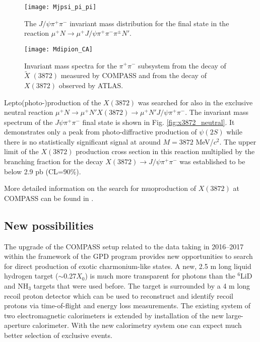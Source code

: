 \documentclass[a4paper]{jpconf}
\begin{document}
 \begin{figure}
 \begin{minipage}{18pc}
   \texttt{[image: Mjpsi\_pi\_pi]}  
     \caption{\label{fig:x3872}
 The $J/\psi\pi^+\pi^-$ invariant mass distribution for the final state in the reaction $\mu^+ N \to \mu^+ J/\psi\pi^+\pi^-\pi^{\pm} N'$.}
\end{minipage}\hspace{2pc}%
\begin{minipage}{18pc}
   \texttt{[image: Mdipion\_CA]}  
     \caption{\label{fig:pipi} Invariant mass spectra for the $\pi^+\pi^-$ subsystem from the decay of $\widetilde{X}􏰐(3872)$ measured by COMPASS  and from the decay of $X(3872)$ observed by ATLAS.}
\end{minipage}
 \end{figure}
 
 Lepto(photo-)production of the $X(3872)$ was searched for also in the exclusive neutral reaction $\mu^+ N \rightarrow \mu^+ N' X(3872) \rightarrow \mu^+ N' J/\psi \pi^+\pi^-$. The invariant mass spectrum of the $J\psi\pi^+\pi^-$ final state is shown in Fig. \ref{fig:x3872_neutral}. It demonstrates only a peak from photo-diffractive production of $\psi(2S)$ while there is no statistically significant signal at around $M=3872$ MeV/$c^2$. The upper limit of the $X(3872)$ production cross section in this reaction multiplied by the branching fraction for the decay $X(3872)\rightarrow J/\psi\pi^+\pi^-$ was established to be below 2.9 pb (CL=90\%).
 
 More detailed information on the search for muoproduction of $X(3872)$ at COMPASS can be found in \cite{Aghasyan:2018vuq}.
 
\subsection{New possibilities}
The upgrade of the COMPASS setup related to the data taking in 2016--2017 within the framework of the GPD program \cite{proposal2} provides new opportunities to search for direct production of exotic charmonium-like states. A new, 2.5 m long liquid hydrogen target ($\sim$0.27$X_{0}$) is much more transparent for photons than the $^6$LiD and NH$_3$ targets that were used before. The 
target is surrounded by a 4 m long recoil proton detector which can be used to reconstruct and identify recoil protons via time-of-flight and energy loss measurements. The existing system of two electromagnetic calorimeters is extended by installation of the new large-aperture calorimeter. With the new calorimetry system one can expect much better selection of exclusive events. 
\end{document}

